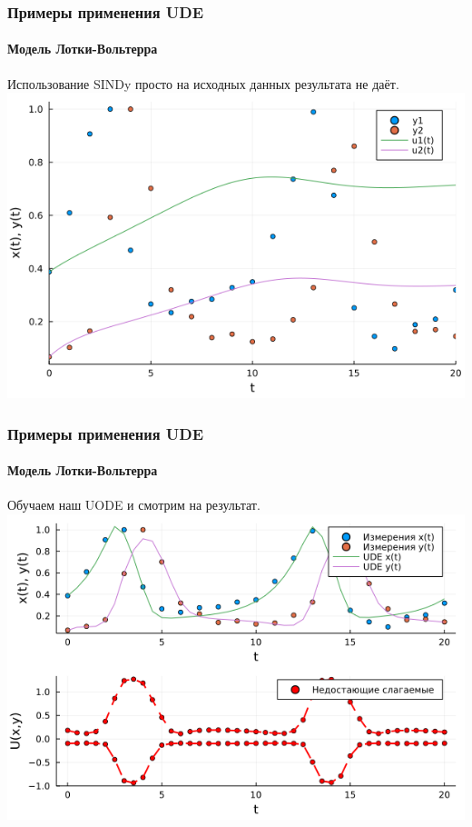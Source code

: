 \documentclass[10pt,pdf,hyperref={unicode}]{beamer}
\begin{document}
			\begin{frame}
				\frametitle{Примеры применения UDE} 
				\framesubtitle{Модель Лотки-Вольтерра}
				\begin{center}
					Использование SINDy просто на исходных данных результата не даёт.
					\includegraphics[width=0.7\linewidth]{sindy_solo.png}
				\end{center}
			\end{frame}
	
			\begin{frame}
				\frametitle{Примеры применения UDE} 
				\framesubtitle{Модель Лотки-Вольтерра}
				\begin{center}
					Обучаем наш UODE и смотрим на результат.
					\includegraphics[width=0.8\linewidth]{ude_missing_term_predict_lotka_new.png}
				\end{center}
			\end{frame}
		
\end{document}
